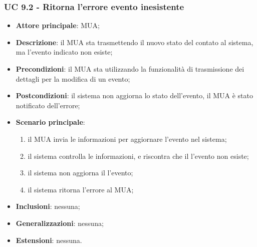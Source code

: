 \subsubsection{UC 9.2 - Ritorna l'errore evento inesistente} \label{sec:UC9.2}
    \begin{itemize}
        \item \textbf{Attore principale}: MUA;
        \item \textbf{Descrizione}: il MUA sta trasmettendo il nuovo stato del contato al sistema, ma l'evento indicato non esiste;
        \item \textbf{Precondizioni}: il MUA sta utilizzando la funzionalità di trasmissione dei dettagli per la modifica di un evento;
        \item \textbf{Postcondizioni}: il sistema non aggiorna lo stato dell'evento, il MUA è stato notificato dell'errore;
        \item \textbf{Scenario principale}:
            \begin{enumerate}
                \item il MUA invia le informazioni per aggiornare l'evento nel sistema;
                \item il sistema controlla le informazioni, e riscontra che il l'evento non esiste;
                \item il sistema non aggiorna il l'evento;
                \item il sistema ritorna l'errore al MUA;
            \end{enumerate}
        \item \textbf{Inclusioni}: nessuna;
        \item \textbf{Generalizzazioni}: nessuna;
        \item \textbf{Estensioni}: nessuna.
    \end{itemize}

